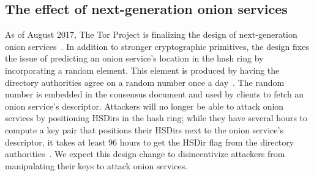 \subsection{The effect of next-generation onion services}
As of August 2017, The Tor Project is finalizing the design of next-generation
onion services~\cite{prop224}.  In addition to stronger cryptographic
primitives, the design fixes the issue of predicting an onion service's location
in the hash ring by incorporating a random element.  This element is produced by
having the directory authorities agree on a random number once a
day~\cite{prop250}.  The random number is embedded in the consensus document and
used by clients to fetch an onion service's descriptor.  Attackers will no
longer be able to attack onion services by positioning HSDirs in the hash ring;
while they have several hours to compute a key pair that positions their HSDirs
next to the onion service's descriptor, it takes at least 96 hours to get the
HSDir flag from the directory authorities~\cite[\S~3.4.2]{dir-spec}.  We expect
this design change to disincentivize attackers from manipulating their keys to
attack onion services.
